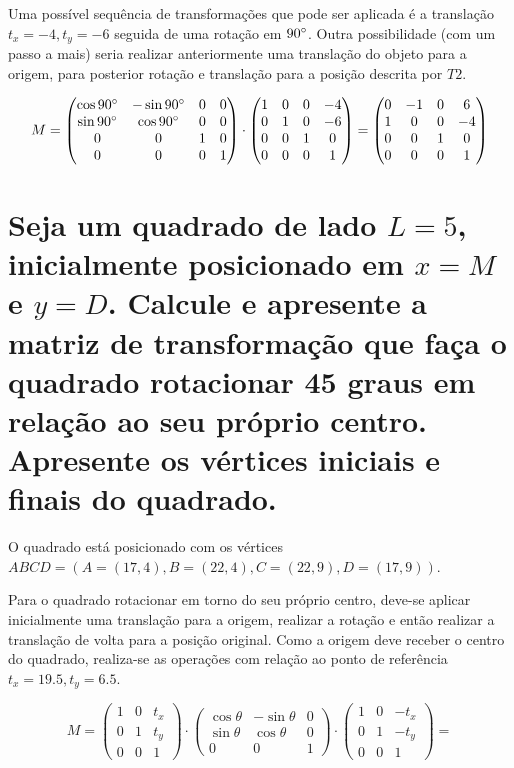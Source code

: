 \documentclass{article}
\begin{document}
Uma possível sequência de transformações que pode ser aplicada é a translação $t_x = -4, t_y = -6$ seguida de uma rotação em $90 \degree$. Outra possibilidade (com um passo a mais) seria realizar anteriormente uma translação do objeto para a origem, para posterior rotação e translação para a posição descrita por $T2$.

$$M = \begin{pmatrix}
	\cos90 \degree & -\sin90 \degree & 0 & 0\\
	\sin90 \degree & \cos90 \degree & 0 & 0\\
	0 & 0 & 1 & 0\\
	0 & 0 & 0 & 1
\end{pmatrix}
\cdot
\begin{pmatrix}
	1 & 0 & 0 & -4\\
	0 & 1 & 0 & -6\\
	0 & 0 & 1 & 0\\
	0 & 0 & 0 & 1
\end{pmatrix}
=
\begin{pmatrix}
	0 & -1 & 0 & 6\\
	1 & 0 & 0 & -4\\
	0 & 0 & 1 & 0\\
	0 & 0 & 0 & 1
\end{pmatrix}
$$


\section{Seja um quadrado de lado $L = 5$, inicialmente posicionado em $x = M$ e $y = D$. Calcule e apresente a matriz de transformação que faça o quadrado rotacionar 45 graus em relação ao seu próprio centro. Apresente os vértices iniciais e finais do quadrado.}

O quadrado está posicionado com os vértices $ABCD = (A=(17, 4), B=(22, 4), C=(22, 9), D=(17, 9))$.

Para o quadrado rotacionar em torno do seu próprio centro, deve-se aplicar inicialmente uma translação para a origem, realizar a rotação e então realizar a translação de volta para a posição original. Como a origem deve receber o centro do quadrado, realiza-se as operações com relação ao ponto de referência $t_x = 19.5, t_y = 6.5$.

$$M = \begin{pmatrix}
	1 & 0 & t_x\\
	0 & 1 & t_y\\
	0 & 0 & 1
\end{pmatrix} \cdot \begin{pmatrix}
	\cos\theta & -\sin\theta & 0\\
	\sin\theta & \cos\theta & 0\\
	0 & 0 & 1
\end{pmatrix}
\cdot
\begin{pmatrix}
	1 & 0 & -t_x\\
	0 & 1 & -t_y\\
	0 & 0 & 1
\end{pmatrix} =$$
\end{document}
